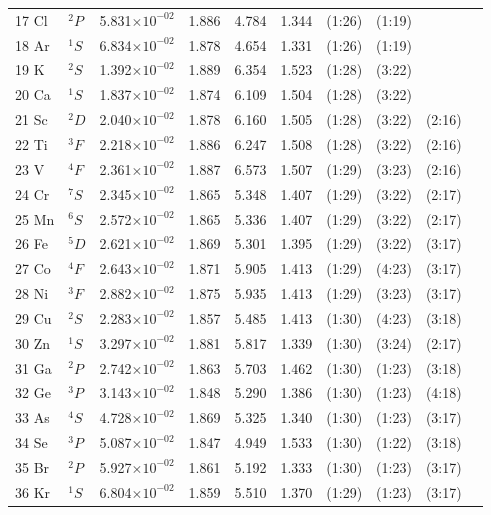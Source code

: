 \documentclass[12pt]{report}
\begin{document}
\begin{longtable}{l l r r r r r r r r}
17 Cl & $^{2}P$ & 5.831$\times10^{-02}$ & 1.886 & 4.784 & 1.344 & (1:26) & (1:19)     \\
18 Ar & $^{1}S$ & 6.834$\times10^{-02}$ & 1.878 & 4.654 & 1.331 & (1:26) & (1:19)     \\
19 K & $^{2}S$ & 1.392$\times10^{-02}$ & 1.889 & 6.354 & 1.523 & (1:28) & (3:22)     \\
20 Ca & $^{1}S$ & 1.837$\times10^{-02}$ & 1.874 & 6.109 & 1.504 & (1:28) & (3:22)     \\
21 Sc & $^{2}D$ & 2.040$\times10^{-02}$ & 1.878 & 6.160 & 1.505 & (1:28) & (3:22) & (2:16)   \\
22 Ti & $^{3}F$ & 2.218$\times10^{-02}$ & 1.886 & 6.247 & 1.508 & (1:28) & (3:22) & (2:16)   \\
23 V & $^{4}F$ & 2.361$\times10^{-02}$ & 1.887 & 6.573 & 1.507 & (1:29) & (3:23) & (2:16)   \\
24 Cr & $^{7}S$ & 2.345$\times10^{-02}$ & 1.865 & 5.348 & 1.407 & (1:29) & (3:22) & (2:17)   \\
25 Mn & $^{6}S$ & 2.572$\times10^{-02}$ & 1.865 & 5.336 & 1.407 & (1:29) & (3:22) & (2:17)   \\
26 Fe & $^{5}D$ & 2.621$\times10^{-02}$ & 1.869 & 5.301 & 1.395 & (1:29) & (3:22) & (3:17)   \\
27 Co & $^{4}F$ & 2.643$\times10^{-02}$ & 1.871 & 5.905 & 1.413 & (1:29) & (4:23) & (3:17)   \\
28 Ni & $^{3}F$ & 2.882$\times10^{-02}$ & 1.875 & 5.935 & 1.413 & (1:29) & (3:23) & (3:17)   \\
29 Cu & $^{2}S$ & 2.283$\times10^{-02}$ & 1.857 & 5.485 & 1.413 & (1:30) & (4:23) & (3:18)   \\
30 Zn & $^{1}S$ & 3.297$\times10^{-02}$ & 1.881 & 5.817 & 1.339 & (1:30) & (3:24) & (2:17)   \\
31 Ga & $^{2}P$ & 2.742$\times10^{-02}$ & 1.863 & 5.703 & 1.462 & (1:30) & (1:23) & (3:18)   \\
32 Ge & $^{3}P$ & 3.143$\times10^{-02}$ & 1.848 & 5.290 & 1.386 & (1:30) & (1:23) & (4:18)   \\
33 As & $^{4}S$ & 4.728$\times10^{-02}$ & 1.869 & 5.325 & 1.340 & (1:30) & (1:23) & (3:17)   \\
34 Se & $^{3}P$ & 5.087$\times10^{-02}$ & 1.847 & 4.949 & 1.533 & (1:30) & (1:22) & (3:18)   \\
35 Br & $^{2}P$ & 5.927$\times10^{-02}$ & 1.861 & 5.192 & 1.333 & (1:30) & (1:23) & (3:17)   \\
36 Kr & $^{1}S$ & 6.804$\times10^{-02}$ & 1.859 & 5.510 & 1.370 & (1:29) & (1:23) & (3:17)   \\

\end{longtable}
\end{document}
